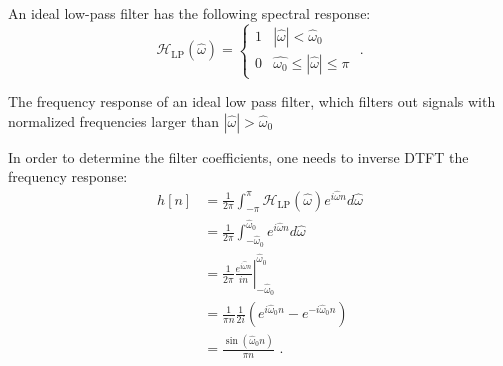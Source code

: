 An ideal low-pass filter has the following spectral response:
\begin{equation}
  \mathcal{H}_{\mathrm{LP}}(\hat{\omega}) = \left\{ \begin{array}{cc}
    1 & |\hat{\omega}| < \hat{\omega}_0           \\
    0 & \hat{\omega_0} \le |\hat{\omega}| \le \pi
  \end{array}\right.\,\,.
\end{equation}
\begin{marginfigure}
  \begin{center}
  \end{center}
  \caption{The frequency response of an ideal low pass filter, which filters out signals with normalized frequencies larger than $|\hat{\omega}|>\hat{\omega}_0$}
\end{marginfigure}
In order to determine the filter coefficients, one needs to inverse DTFT the frequency response:
\begin{align}
  h[n] & =\frac{1}{2\pi}\int_{-\pi}^{\pi}\mathcal{H}_{\mathrm{LP}}(\hat{\omega}) e^{i\hat{\omega}n} d\hat{\omega} \\
       & = \frac{1}{2\pi}\int_{-\hat{\omega}_0}^{\hat{\omega}_0} e^{i\hat{\omega}n}d\hat{\omega}                  \\
       & = \frac{1}{2\pi} \left.\frac{e^{i\hat{\omega}n}}{i n}\right\vert_{-\hat{\omega}_0}^{\hat{\omega}_0}      \\
       & =\frac{1}{\pi n}\frac{1}{2i}(e^{i\hat{\omega}_0 n} - e^{-i\hat{\omega}_0n})                              \\
       & = \frac{\sin(\hat{\omega}_0 n)}{\pi n}\,\,.
\end{align}
